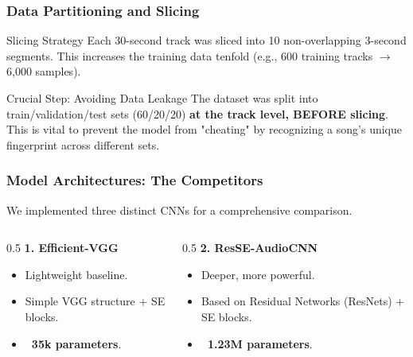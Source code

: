\documentclass{beamer}
\begin{document}
\begin{frame}
    \frametitle{Data Partitioning and Slicing}
    \begin{block}{Slicing Strategy}
        Each 30-second track was sliced into 10 non-overlapping 3-second segments. This increases the training data tenfold (e.g., 600 training tracks $\rightarrow$ 6,000 samples).
    \end{block}

    \begin{alertblock}{Crucial Step: Avoiding Data Leakage}
        The dataset was split into train/validation/test sets (60/20/20) \textbf{at the track level, BEFORE slicing}. This is vital to prevent the model from "cheating" by recognizing a song's unique fingerprint across different sets.
    \end{alertblock}
\end{frame}

\begin{frame}
    \frametitle{Model Architectures: The Competitors}
    We implemented three distinct CNNs for a comprehensive comparison.
    \vspace{0.9em}
    \begin{columns}
        \begin{column}{0.5\textwidth}
            \textbf{1. Efficient-VGG}
            \vspace{0.3em}%
            {\setlength{\itemsep}{5pt}\setlength{\topsep}{2pt}%
            \begin{itemize}
                \item Lightweight baseline.
                \item Simple VGG structure + SE blocks.
                \item \textbf{~35k parameters}.
            \end{itemize}}
        \end{column}
        \begin{column}{0.5\textwidth}
            \textbf{2. ResSE-AudioCNN}
            \vspace{0.3em}
            {\setlength{\itemsep}{5pt}\setlength{\topsep}{2pt}
            \begin{itemize}
                \item Deeper, more powerful.
                \item Based on Residual Networks (ResNets) + SE blocks.
                \item \textbf{~1.23M parameters}.
            \end{itemize}}
        \end{column}
    \end{columns}
\end{frame}
\end{document}

